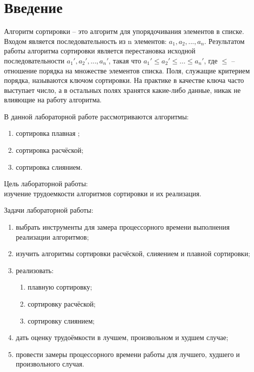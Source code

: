 \section*{\large Введение}

\par Алгоритм сортировки – это алгоритм для упорядочивания элементов в списке. Входом является последовательность из n элементов: \begin{math}a_1, a_2, ..., a_n\end{math}. Результатом работы алгоритма сортировки является перестановка исходной последовательности \begin{math}a_1', a_2', ..., a_n'\end{math}, такая что
\begin{math}a_1' \leq a_2'\leq ... \leq a_n'\end{math}, где \begin{math}\leq\end{math} – отношение порядка на множестве элементов списка. Поля, служащие критерием порядка, называются ключом сортировки. На практике в качестве ключа часто выступает число, а в остальных полях хранятся какие-либо данные, никак не влияющие на работу алгоритма.
	
	В данной лабораторной работе рассмотриваются алгоритмы:

	\begin{enumerate}
		\item сортировка плавная ;
		\item сортировка расчёской;
		\item сортировка слиянием.
	\end{enumerate}

	Цель лабораторной работы:\\
	изучение трудоемкости алгоритмов сортировки и их реализация.

	Задачи лабораторной работы:
	\begin{enumerate}
		\item выбрать инструменты для замера процессорного времени выполнения реализации алгоритмов;
		\item изучить алгоритмы сортировки расчёской, слияением и плавной сортировки;
		\item реализовать:
		\begin{enumerate}
			\item плавную сортировку;
			\item сортировку расчёской;
			\item сортировку слиянием;
		\end{enumerate}
		\item дать оценку трудоёмкости в лучшем, произвольном и худшем случае;
		\item провести замеры процессорного времени работы для лучшего, худшего и произвольного случая.
	\end{enumerate}
\newpage
